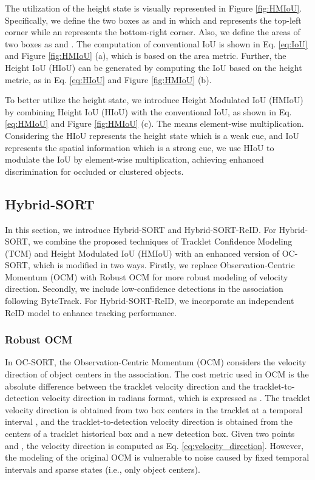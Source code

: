 \documentclass[letterpaper]{article} \usepackage{aaai23}  \usepackage{times}  \usepackage{helvet}  \usepackage{courier}  \usepackage[hyphens]{url}  \usepackage{graphicx} \urlstyle{rm} \def\UrlFont{\rm}  \usepackage{natbib}  \usepackage{caption} \frenchspacing  \setlength{\pdfpagewidth}{8.5in}  \setlength{\pdfpageheight}{11in}  \usepackage{algorithm}
\begin{document}
The utilization of the height state is visually represented in Figure \ref{fig:HMIoU}. Specifically, we define the two boxes as  and  in which  and  represents the top-left corner while  an  represents the bottom-right corner. Also, we define the areas of two boxes as  and . The computation of conventional IoU is shown in Eq. \ref{eq:IoU} and Figure \ref{fig:HMIoU} (a), which is based on the area metric. Further, the Height IoU (HIoU) can be generated by computing the IoU based on the height metric, as in Eq. \ref{eq:HIoU} and Figure \ref{fig:HMIoU} (b). 









To better utilize the height state, we introduce Height Modulated IoU (HMIoU) by combining Height IoU (HIoU) with the conventional IoU, as shown in Eq. \ref{eq:HMIoU} and Figure \ref{fig:HMIoU} (c). The  means element-wise multiplication. Considering the HIoU represents the height state which is a weak cue, and IoU represents the spatial information which is a strong cue, we use HIoU to modulate the IoU by element-wise multiplication, achieving enhanced discrimination for occluded or clustered objects. 




\subsection{Hybrid-SORT}
In this section, we introduce Hybrid-SORT and Hybrid-SORT-ReID. For Hybrid-SORT, we combine the proposed techniques of Tracklet Confidence Modeling (TCM) and Height Modulated IoU (HMIoU) with an enhanced version of OC-SORT, which is modified in two ways. Firstly, we replace Observation-Centric Momentum (OCM) with Robust OCM for more robust modeling of velocity direction. Secondly, we include low-confidence detections in the association following ByteTrack. For Hybrid-SORT-ReID, we incorporate an independent ReID model to enhance tracking performance. 

\subsubsection{Robust OCM}
In OC-SORT, the Observation-Centric Momentum (OCM) considers the velocity direction of object centers in the association. The cost metric used in OCM is the absolute difference between the tracklet velocity direction  and the tracklet-to-detection velocity direction  in radians format, which is expressed as . The tracklet velocity direction is obtained from two box centers in the tracklet at a temporal interval , and the tracklet-to-detection velocity direction is obtained from the centers of a tracklet historical box and a new detection box. Given two points  and , the velocity direction is computed as Eq. \ref{eq:velocity_direction}. However, the modeling of the original OCM is vulnerable to noise caused by fixed temporal intervals and sparse states (i.e., only object centers).
\end{document}
